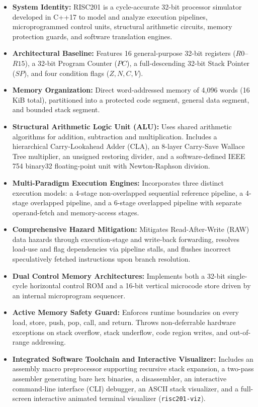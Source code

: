 \documentclass[11pt,a4paper]{article}
\begin{document}
\begin{itemize}
    \item \textbf{System Identity:} RISC201 is a cycle-accurate 32-bit processor simulator developed in C++17 to model and analyze execution pipelines, microprogrammed control units, structural arithmetic circuits, memory protection guards, and software translation engines.
    \item \textbf{Architectural Baseline:} Features 16 general-purpose 32-bit registers ($R0$--$R15$), a 32-bit Program Counter ($PC$), a full-descending 32-bit Stack Pointer ($SP$), and four condition flags ($Z, N, C, V$).
    \item \textbf{Memory Organization:} Direct word-addressed memory of 4,096 words (16\,KiB total), partitioned into a protected code segment, general data segment, and bounded stack segment.
    \item \textbf{Structural Arithmetic Logic Unit (ALU):} Uses shared arithmetic algorithms for addition, subtraction and multiplication. Includes a hierarchical Carry-Lookahead Adder (CLA), an 8-layer Carry-Save Wallace Tree multiplier, an unsigned restoring divider, and a software-defined IEEE 754 binary32 floating-point unit with Newton-Raphson division.
    \item \textbf{Multi-Paradigm Execution Engines:} Incorporates three distinct execution models: a 4-stage non-overlapped sequential reference pipeline, a 4-stage overlapped pipeline, and a 6-stage overlapped pipeline with separate operand-fetch and memory-access stages.
    \item \textbf{Comprehensive Hazard Mitigation:} Mitigates Read-After-Write (RAW) data hazards through execution-stage and write-back forwarding, resolves load-use and flag dependencies via pipeline stalls, and flushes incorrect speculatively fetched instructions upon branch resolution.
    \item \textbf{Dual Control Memory Architectures:} Implements both a 32-bit single-cycle horizontal control ROM and a 16-bit vertical microcode store driven by an internal microprogram sequencer.
    \item \textbf{Active Memory Safety Guard:} Enforces runtime boundaries on every load, store, push, pop, call, and return. Throws non-deferrable hardware exceptions on stack overflow, stack underflow, code region writes, and out-of-range addressing.
    \item \textbf{Integrated Software Toolchain and Interactive Visualizer:} Includes an assembly macro preprocessor supporting recursive stack expansion, a two-pass assembler generating bare hex binaries, a disassembler, an interactive command-line interface (CLI) debugger, an ASCII stack visualizer, and a full-screen interactive animated terminal visualizer (\texttt{risc201-viz}).
\end{itemize}
\end{document}
